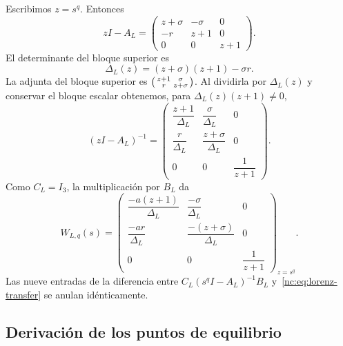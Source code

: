 Escribimos \(z=s^q\). Entonces
\begin{equation}
 zI-A_L=
 \begin{pmatrix}
 z+\sigma&-\sigma&0\\
 -r&z+1&0\\
 0&0&z+1
 \end{pmatrix}.
\end{equation}
El determinante del bloque superior es
\begin{equation}
 \Delta_L(z)=(z+\sigma)(z+1)-\sigma r.
 \label{nc:eq:lorenz-delta}
\end{equation}
La adjunta del bloque superior es
\(\begin{psmallmatrix}z+1&\sigma\\r&z+\sigma\end{psmallmatrix}\).
Al dividirla por \(\Delta_L(z)\) y conservar el bloque escalar obtenemos,
para \(\Delta_L(z)(z+1)\ne0\),
\begin{equation}
 (zI-A_L)^{-1}=
 \begin{pmatrix}
 \dfrac{z+1}{\Delta_L}&\dfrac{\sigma}{\Delta_L}&0\\[7pt]
 \dfrac{r}{\Delta_L}&\dfrac{z+\sigma}{\Delta_L}&0\\[7pt]
 0&0&\dfrac{1}{z+1}
 \end{pmatrix}.
\end{equation}
Como \(C_L=I_3\), la multiplicación por \(B_L\) da
\begin{equation}
 W_{L,q}(s)=
 \begin{pmatrix}
 \dfrac{-a(z+1)}{\Delta_L}&
 \dfrac{-\sigma}{\Delta_L}&0\\[8pt]
 \dfrac{-ar}{\Delta_L}&
 \dfrac{-(z+\sigma)}{\Delta_L}&0\\[8pt]
 0&0&\dfrac{1}{z+1}
 \end{pmatrix}_{z=s^q}.
 \label{nc:eq:lorenz-transfer}
\end{equation}
Las nueve entradas de la diferencia entre
\(C_L(s^qI-A_L)^{-1}B_L\) y~\eqref{nc:eq:lorenz-transfer} se anulan
idénticamente.

\subsection{Derivación de los puntos de equilibrio}

